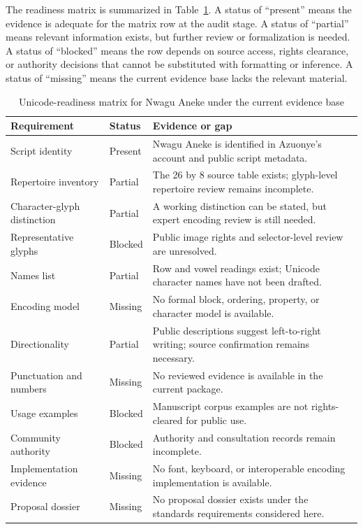 \documentclass[sigconf,nonacm]{acmart}
\begin{document}
The readiness matrix is summarized in Table~\ref{tab:readiness}. A status of
``present'' means the evidence is adequate for the matrix row at the audit
stage. A status of ``partial'' means relevant information exists, but further
review or formalization is needed. A status of ``blocked'' means the row depends
on source access, rights clearance, or authority decisions that cannot be
substituted with formatting or inference. A status of ``missing'' means the
current evidence base lacks the relevant material.

\begin{table}[t]
\caption{Unicode-readiness matrix for Nwagu Aneke under the current evidence base}
\label{tab:readiness}
\begin{tabular}{p{}p{}p{}}
\toprule
Requirement & Status & Evidence or gap \\
\midrule
Script identity & Present & Nwagu Aneke is identified in Azuonye's account and public script metadata. \\
Repertoire inventory & Partial & The 26 by 8 source table exists; glyph-level repertoire review remains incomplete. \\
Character-glyph distinction & Partial & A working distinction can be stated, but expert encoding review is still needed. \\
Representative glyphs & Blocked & Public image rights and selector-level review are unresolved. \\
Names list & Partial & Row and vowel readings exist; Unicode character names have not been drafted. \\
Encoding model & Missing & No formal block, ordering, property, or character model is available. \\
Directionality & Partial & Public descriptions suggest left-to-right writing; source confirmation remains necessary. \\
Punctuation and numbers & Missing & No reviewed evidence is available in the current package. \\
Usage examples & Blocked & Manuscript corpus examples are not rights-cleared for public use. \\
Community authority & Blocked & Authority and consultation records remain incomplete. \\
Implementation evidence & Missing & No font, keyboard, or interoperable encoding implementation is available. \\
Proposal dossier & Missing & No proposal dossier exists under the standards requirements considered here. \\
\bottomrule
\end{tabular}
\end{table}
\end{document}
